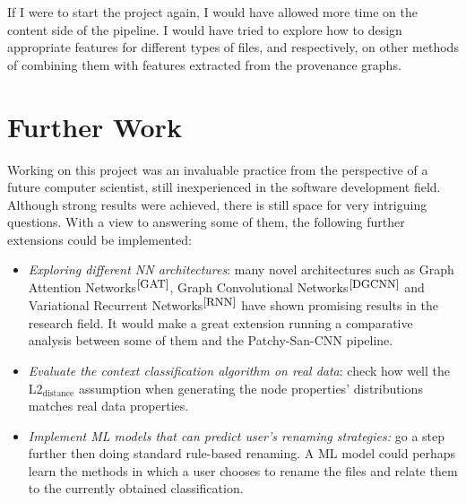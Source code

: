     If I were to start the project again, I would have allowed more time on the content side of the pipeline. I would have tried to explore how to design appropriate features for different types of files, and respectively, on other methods of combining them with features extracted from the provenance graphs. \\ 
    
    \section{Further Work}
    
    Working on this project was an invaluable practice from the perspective of a future computer scientist, still inexperienced in the software development field. Although strong results were achieved, there is still space for very intriguing questions. With a view to answering some of them, the following further extensions could be implemented:
    
    \begin{itemize}
        \item \textit{Exploring different NN architectures}: many novel architectures such as Graph Attention Networks$^{\small \cite{GAT}}$, Graph Convolutional Networks$^{\small \cite{DGCNN}}$ and Variational Recurrent Networks$^{\small \cite{RNN}}$ have shown promising results in the research field. It would make a great extension running a comparative analysis between some of them and the Patchy-San-CNN pipeline.
        
        \item \textit{Evaluate the context classification algorithm on real data}: check how well the L2$_{\text{distance}}$ assumption when generating the node properties' distributions matches real data properties. 
        
        \item \textit{Implement ML models that can predict user's renaming strategies:} go a step further then doing standard rule-based renaming. A ML model could perhaps learn the methods in which a user chooses to rename the files and relate them to the currently obtained classification.    
    
    \end{itemize}
    
